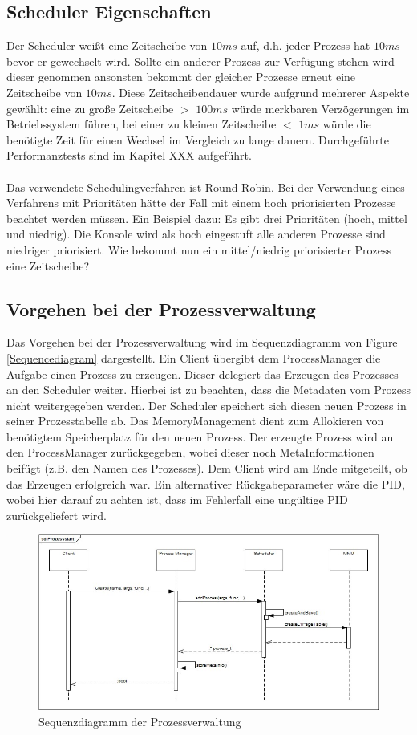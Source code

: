 \subsection{Scheduler Eigenschaften}
Der Scheduler weißt eine Zeitscheibe von $10ms$ auf, d.h. jeder Prozess hat $10ms$ bevor er gewechselt wird. Sollte ein anderer Prozess zur Verfügung stehen wird dieser genommen ansonsten bekommt der gleicher Prozesse erneut eine Zeitscheibe von $10ms$. Diese Zeitscheibendauer wurde aufgrund mehrerer Aspekte gewählt: eine zu große Zeitscheibe $>$ $100ms$ würde merkbaren Verzögerungen im Betriebssystem führen, bei einer zu kleinen Zeitscheibe $<$ $1ms$ würde die benötigte Zeit für einen Wechsel im Vergleich zu lange dauern. Durchgeführte Performanztests sind im Kapitel XXX aufgeführt. \\ \\
Das verwendete Schedulingverfahren ist Round Robin. Bei der Verwendung eines Verfahrens mit Prioritäten hätte der Fall mit einem hoch priorisierten Prozesse beachtet werden müssen. Ein Beispiel dazu: Es gibt drei Prioritäten (hoch, mittel und niedrig). Die Konsole wird als hoch eingestuft alle anderen Prozesse sind niedriger priorisiert. Wie bekommt nun ein mittel/niedrig priorisierter Prozess eine Zeitscheibe?

\subsection{Vorgehen bei der Prozessverwaltung}
Das Vorgehen bei der Prozessverwaltung wird im Sequenzdiagramm von Figure \ref{Sequencediagram} dargestellt. Ein Client übergibt dem ProcessManager die Aufgabe einen Prozess zu erzeugen. Dieser delegiert das Erzeugen des Prozesses an den Scheduler weiter. Hierbei ist zu beachten, dass die Metadaten vom Prozess nicht weitergegeben werden. Der Scheduler speichert sich diesen neuen Prozess in seiner Prozesstabelle ab. Das MemoryManagement dient zum Allokieren von benötigtem Speicherplatz für den neuen Prozess. Der erzeugte Prozess wird an den ProcessManager zurückgegeben, wobei dieser noch MetaInformationen beifügt (z.B. den Namen des Prozesses). Dem Client wird am Ende mitgeteilt, ob das Erzeugen erfolgreich war. Ein alternativer Rückgabeparameter wäre die PID, wobei hier darauf zu achten ist, dass im Fehlerfall eine ungültige PID zurückgeliefert wird.

\begin{figure}[H]
	\includegraphics[scale=0.70]{chapters/processmanagement/figures/processmanagement-sequence-diagram}
	\caption{Sequenzdiagramm der Prozessverwaltung}
	\label{fig:Sequencediagram}
\end{figure}

\pagebreak 